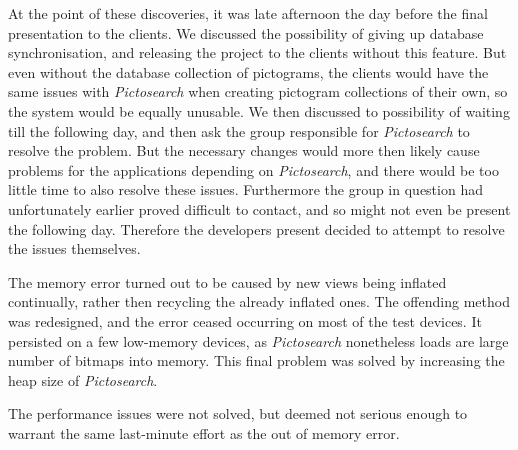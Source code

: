 At the point of these discoveries, it was late afternoon the day before the final presentation to the clients.
We discussed the possibility of giving up database synchronisation, and releasing the project to the clients without this feature.
But even without the database collection of pictograms, the clients would have the same issues with \textit{Pictosearch} when creating pictogram collections of their own, so the system would be equally unusable.
We then discussed to possibility of waiting till the following day, and then ask the group responsible for \textit{Pictosearch} to resolve the problem.
But the necessary changes would more then likely cause problems for the applications depending on \textit{Pictosearch}, and there would be too little time to also resolve these issues.
Furthermore the group in question had unfortunately earlier proved difficult to contact, and so might not even be present the following day. 
Therefore the developers present decided to attempt to resolve the issues themselves. 

The memory error turned out to be caused by new views being inflated continually, rather then recycling the already inflated ones.
The offending method was redesigned, and the error ceased occurring on most of the test devices.
It persisted on a few low-memory devices, as \textit{Pictosearch} nonetheless loads are large number of bitmaps into memory.
This final problem was solved by increasing the heap size of \textit{Pictosearch}.

The performance issues were not solved, but deemed not serious enough to warrant the same last-minute effort as the out of memory error.